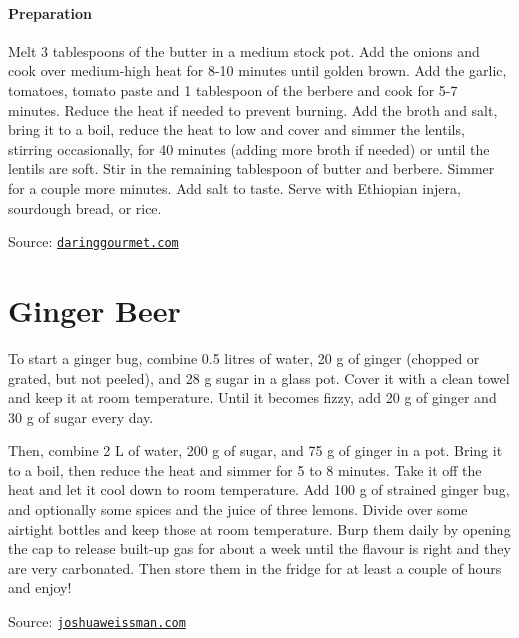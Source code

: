 \paragraph{Preparation}
Melt 3 tablespoons of the butter in a medium stock pot.  Add the onions and cook over medium-high heat for 8-10 minutes until golden brown.  
Add the garlic, tomatoes, tomato paste and 1 tablespoon of the berbere and cook for 5-7 minutes. Reduce the heat if needed to prevent burning.
Add the broth and salt, bring it to a boil, reduce the heat to low and cover and simmer the lentils, stirring occasionally, for 40 minutes (adding more broth if needed) or until the lentils are soft.
Stir in the remaining tablespoon of butter and berbere. Simmer for a couple more minutes. Add salt to taste.
Serve with Ethiopian injera, sourdough bread, or rice.

Source: \href{https://www.daringgourmet.com/misir-wat-ethiopian-spiced-red-lentils/}{\texttt{daringgourmet.com}}

\section*{Ginger Beer}

To start a ginger bug, combine 0.5 litres of water, 20 g of ginger (chopped or grated, but not peeled), and 28 g sugar in a glass pot. Cover it with a clean towel and keep it at room temperature. Until it becomes fizzy, add 20 g of ginger and 30 g of sugar every day.

Then, combine 2 L of water, 200 g of sugar, and 75 g of ginger in a pot. Bring it to a boil, then reduce the heat and simmer for 5 to 8 minutes. Take it off the heat and let it cool down to room temperature. Add 100 g of strained ginger bug, and optionally some spices and the juice of three lemons. Divide over some airtight bottles and keep those at room temperature. Burp them daily by opening the cap to release built-up gas for about a week until the flavour is right and they are very carbonated. Then store them in the fridge for at least a couple of hours and enjoy!

Source: \href{https://www.joshuaweissman.com/post/fermented-ginger-beer}{\texttt{joshuaweissman.com}}
